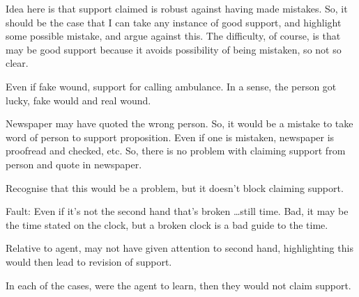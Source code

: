 \begin{note}

  Idea here is that support claimed is robust against having made mistakes.
  So, it should be the case that I can take any instance of good support, and highlight some possible mistake, and argue against this.
  The difficulty, of course, is that may be good support because it avoids possibility of being mistaken, so not so clear.

  Even if fake wound, support for calling ambulance.
  In a sense, the person got lucky, fake would and real wound.


  Newspaper may have quoted the wrong person.
  So, it would be a mistake to take word of person to support proposition.
  Even if one is mistaken, newspaper is proofread and checked, etc.
  So, there is no problem with claiming support from person and quote in newspaper.

  Recognise that this would be a problem, but it doesn't block claiming support.

  Fault:
  Even if it's not the second hand that's broken \dots still time.
  Bad, it may be the time stated on the clock, but a broken clock is a bad guide to the time.

  Relative to agent, may not have given attention to second hand, highlighting this would then lead to revision of support.
\end{note}

\begin{note}
  In each of the cases, were the agent to learn, then they would not claim support.
\end{note}

